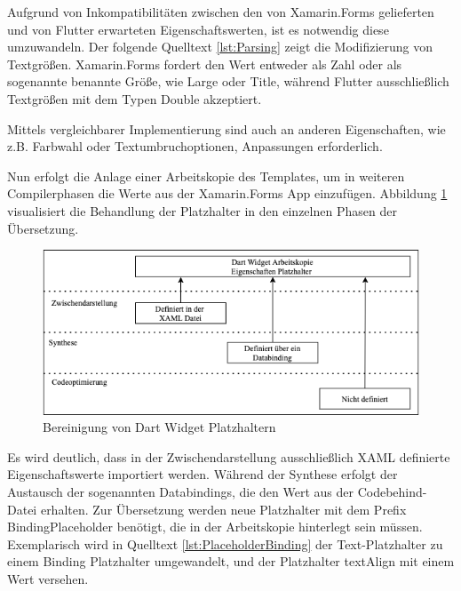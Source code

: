  

Aufgrund von Inkompatibilitäten zwischen den von Xamarin.Forms gelieferten und von Flutter erwarteten Eigenschaftswerten, ist es notwendig diese umzuwandeln.  Der folgende Quelltext \ref{lst:Parsing} zeigt die Modifizierung von Textgrößen.  Xamarin.Forms fordert den Wert entweder als Zahl oder als sogenannte benannte Größe,  wie \glq Large\grq{} oder \glq Title\grq , während Flutter ausschließlich Textgrößen mit dem Typen Double akzeptiert.   

 

Mittels vergleichbarer Implementierung sind auch an anderen Eigenschaften,  wie z.B. Farbwahl oder Textumbruchoptionen,  Anpassungen erforderlich.

Nun erfolgt die Anlage einer Arbeitskopie des Templates,  um in weiteren Compilerphasen die Werte aus der Xamarin.Forms App einzufügen.  Abbildung \ref{fig:PlaceholderOptions} visualisiert die Behandlung der Platzhalter in den einzelnen Phasen der Übersetzung.


\begin{figure}[!ht]
 \includegraphics[width=\textwidth,keepaspectratio]{Images/Implementation/DartPlaceHolder.png}
 \caption{Bereinigung von Dart Widget Platzhaltern}
 \label{fig:PlaceholderOptions}
\end{figure}

Es wird deutlich, dass in der Zwischendarstellung ausschließlich XAML definierte Eigenschaftswerte 
importiert werden.  Während der Synthese erfolgt der Austausch der sogenannten Databindings, die den Wert aus der Codebehind-Datei erhalten.  Zur Übersetzung werden neue Platzhalter mit dem Prefix \glq BindingPlaceholder\grq{} benötigt,  die in der Arbeitskopie hinterlegt sein müssen. Exemplarisch wird in Quelltext  \ref{lst:PlaceholderBinding} der Text-Platzhalter zu einem Binding Platzhalter umgewandelt, und der Platzhalter textAlign mit einem Wert versehen. 

